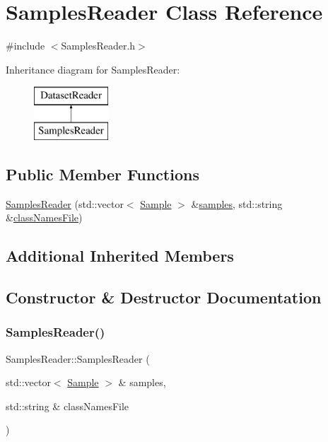 \hypertarget{class_samples_reader}{}\section{Samples\+Reader Class Reference}
\label{class_samples_reader}


{\ttfamily \#include $<$Samples\+Reader.\+h$>$}

Inheritance diagram for Samples\+Reader\+:\begin{figure}[H]
\begin{center}
\leavevmode
\includegraphics[height=2.000000cm]{class_samples_reader}
\end{center}
\end{figure}
\subsection*{Public Member Functions}
\begin{DoxyCompactItemize}
\item 
\hyperlink{class_samples_reader_a482420431f30fab477b3c4fff5a63d67}{Samples\+Reader} (std\+::vector$<$ \hyperlink{struct_sample}{Sample} $>$ \&\hyperlink{class_dataset_reader_adeafe74d71d96205e2920f76d3fc6a72}{samples}, std\+::string \&\hyperlink{class_dataset_reader_a45ded43b56539f1e37a24ca9c94b4611}{class\+Names\+File})
\end{DoxyCompactItemize}
\subsection*{Additional Inherited Members}


\subsection{Constructor \& Destructor Documentation}
\mbox{\label{class_samples_reader_a482420431f30fab477b3c4fff5a63d67}} 
\subsubsection{\texorpdfstring{Samples\+Reader()}{SamplesReader()}}
{\footnotesize\ttfamily Samples\+Reader\+::\+Samples\+Reader (\begin{DoxyParamCaption}\item[{std\+::vector$<$ \hyperlink{struct_sample}{Sample} $>$ \&}]{samples,  }\item[{std\+::string \&}]{class\+Names\+File }\end{DoxyParamCaption})}



